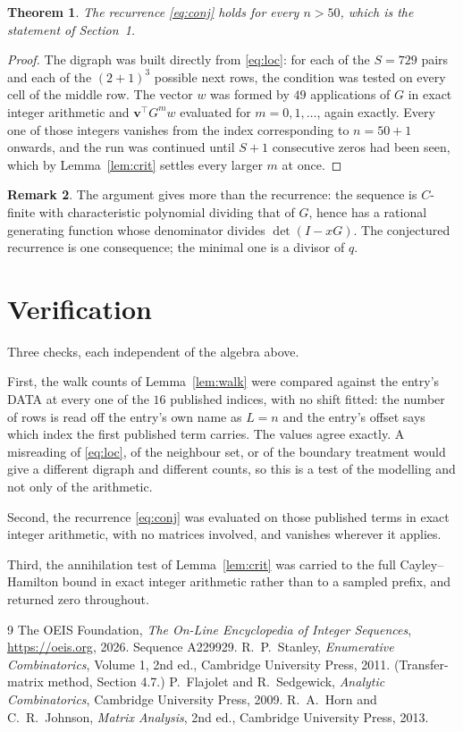 \documentclass[11pt,a4paper]{article}
\theoremstyle{plain}
\newtheorem{theorem}{Theorem}
\theoremstyle{definition}
\newtheorem{remark}[theorem]{Remark}
\begin{document}
\begin{theorem}
The recurrence \eqref{eq:conj} holds for every $n>50$, which is the statement of
Section~1.
\end{theorem}

\begin{proof}
The digraph was built directly from \eqref{eq:loc}: for each of the $S=729$ pairs and each
of the $(2+1)^{3}$ possible next rows, the condition was tested on every cell of
the middle row. The vector $w$ was formed by $49$ applications of $G$ in exact integer
arithmetic and $\mathbf{v}^{\!\top}G^{m}w$ evaluated for $m=0,1,\dots$, again exactly.
Every one of those integers vanishes from the index corresponding to $n=50+1$ onwards,
and the run was continued until $S+1$ consecutive zeros had been seen, which by
Lemma~\ref{lem:crit} settles every larger $m$ at once.
\end{proof}

\begin{remark}
The argument gives more than the recurrence: the sequence is $C$-finite with characteristic
polynomial dividing that of $G$, hence has a rational generating function whose denominator
divides $\det(I-xG)$. The conjectured recurrence is one consequence; the minimal one is a
divisor of $q$.
\end{remark}

\section{Verification}

Three checks, each independent of the algebra above.

First, the walk counts of Lemma~\ref{lem:walk} were compared against the entry's DATA at
every one of the $16$ published indices, with no shift fitted: the number of rows is
read off the entry's own name as $L=n$ and the entry's offset says which index the first
published term carries. The values agree exactly. A misreading of \eqref{eq:loc}, of the
neighbour set, or of the boundary treatment would give a different digraph and different
counts, so this is a test of the modelling and not only of the arithmetic.

Second, the recurrence \eqref{eq:conj} was evaluated on those published terms in exact
integer arithmetic, with no matrices involved, and vanishes wherever it applies.

Third, the annihilation test of Lemma~\ref{lem:crit} was carried to the full
Cayley--Hamilton bound in exact integer arithmetic rather than to a sampled prefix, and
returned zero throughout.

\begin{thebibliography}{9}
 The OEIS Foundation, \emph{The On-Line Encyclopedia of Integer
Sequences}, \url{https://oeis.org}, 2026. Sequence A229929.
 R.~P.~Stanley, \emph{Enumerative Combinatorics}, Volume 1, 2nd ed.,
Cambridge University Press, 2011. (Transfer-matrix method, Section 4.7.)
 P.~Flajolet and R.~Sedgewick, \emph{Analytic Combinatorics}, Cambridge
University Press, 2009.
 R.~A.~Horn and C.~R.~Johnson, \emph{Matrix Analysis}, 2nd ed., Cambridge
University Press, 2013.
\end{thebibliography}
\end{document}
